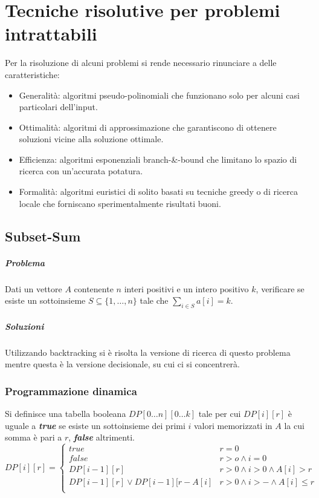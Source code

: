 \chapter{Tecniche risolutive per problemi intrattabili}
Per la risoluzione di alcuni problemi si rende necessario rinunciare a delle caratteristiche:
\begin{itemize}
	\item Generalit\`a: algoritmi pseudo-polinomiali che funzionano solo per alcuni casi particolari dell'input.
	\item Ottimalit\`a: algoritmi di approssimazione che garantiscono di ottenere soluzioni vicine alla soluzione ottimale.
	\item Efficienza: algoritmi esponenziali branch-\&-bound che limitano lo spazio di ricerca con un'accurata potatura.
	\item Formalit\`a: algoritmi euristici di solito basati su tecniche greedy o di ricerca locale che forniscano sperimentalmente risultati buoni.
\end{itemize}
\section{Subset-Sum}
\paragraph{Problema}
Dati un vettore $A$ contenente $n$ interi positivi e un intero positivo $k$, verificare se esiste un sottoinsieme $S\subseteq\{1, \dots, n\}$ tale che $\sum\limits_{i\in S}a[i] = k$.
\paragraph{Soluzioni}
Utilizzando backtracking si \`e risolta la versione di ricerca di questo problema mentre questa \`e la versione decisionale, su cui ci si concentrer\`a. 
\subsection{Programmazione dinamica}
Si definisce una tabella booleana $DP[0\dots n][0\dots k]$ tale per cui $DP[i][r]$ \`e uguale a \emph{\textbf{true}} se esiste un sottoinsieme dei primi $i$ valori memorizzati in $A$
la cui somma \`e pari a $r$, \emph{\textbf{false}} altrimenti.
$$DP[i][r] = 
\begin{cases}
	true \quad\quad\quad & r = 0\\
	false & r > o \land i = 0\\
	DP[i - 1][r] & r > 0 \land i > 0 \land A[i] > r\\
	DP[i - 1][r] \lor DP[i - 1][r - A[i] & r > 0 \land i > - \land A[i]\le r\\
\end{cases}$$


